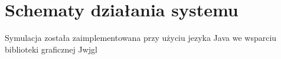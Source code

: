 \chapter{Schematy działania systemu}
\label{cha:srodowisko}

Symulacja została zaimplementowana przy użyciu jezyka Java we wsparciu biblioteki graficznej Jwjgl
